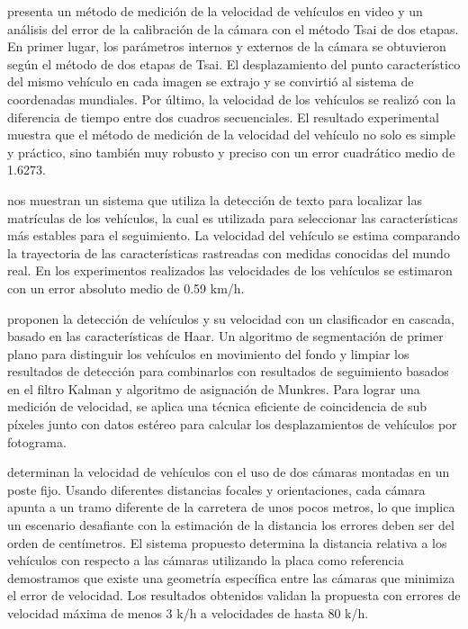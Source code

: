 \citeauthor{yan2010Research} presenta un método de medición de la velocidad de vehículos en video y un análisis del error de la calibración de la cámara con el método Tsai de dos etapas. En primer lugar, los parámetros internos y externos de la cámara se obtuvieron según el método de dos etapas de Tsai. El desplazamiento del punto característico del mismo vehículo en cada imagen se extrajo y se convirtió al sistema de coordenadas mundiales. Por último, la velocidad de los vehículos se realizó con la diferencia de tiempo entre dos cuadros secuenciales. El resultado experimental muestra que el método de medición de la velocidad del vehículo no solo es simple y práctico, sino también muy robusto y preciso con un error cuadrático medio de 1.6273.


\citeauthor{luvizon2014Vehicle} nos muestran un sistema que utiliza la detección de texto para localizar las matrículas de los vehículos, la cual es utilizada para seleccionar las características más estables para el seguimiento. La velocidad del vehículo se estima comparando la trayectoria de las características rastreadas con medidas conocidas del mundo real. En los experimentos realizados las velocidades de los vehículos se estimaron con un error absoluto medio de 0.59 km/h.


\citeauthor{jalalat2016Vehicle} proponen la detección de vehículos y su velocidad con  un clasificador en cascada, basado en las características de Haar. Un algoritmo de segmentación de primer plano para distinguir los vehículos en movimiento del fondo y limpiar los resultados de detección para combinarlos con  resultados de seguimiento basados en el filtro Kalman y algoritmo de asignación de Munkres. Para lograr una medición de velocidad, se aplica una técnica eficiente de coincidencia de sub píxeles junto con datos estéreo para calcular los desplazamientos de vehículos por fotograma.


\citeauthor{llorca2016Two} determinan la velocidad de vehículos con el uso de dos cámaras montadas en un poste fijo. Usando diferentes distancias focales y orientaciones, cada cámara apunta a un tramo diferente de la carretera de unos pocos metros, lo que implica un escenario desafiante con la estimación de la distancia los errores deben ser del orden de centímetros.  El sistema propuesto determina la distancia relativa a los vehículos con respecto a las cámaras utilizando la placa como referencia demostramos que existe una geometría específica entre las cámaras que minimiza el error de velocidad. Los resultados obtenidos validan la propuesta con errores de velocidad máxima  de menos 3 k/h a velocidades de hasta 80 k/h.


